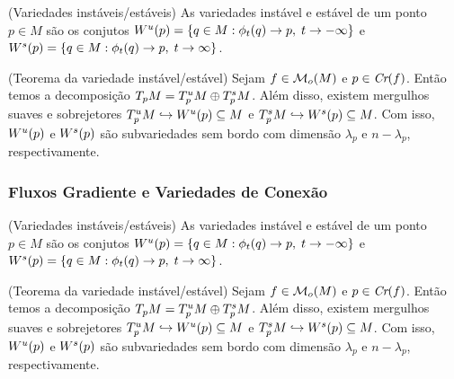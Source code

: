 \documentclass{beamer}
\begin{document}
	\begin{frame}
		\begin{definicao}
			(Variedades instáveis/estáveis)  As variedades instável e estável de um ponto $p \in M$ são os conjutos $W^{u}(p) = \{q\in M: \phi_{t}(q) \to p,\; t\to -\infty\}$ e $W^{s}(p) = \{q\in M: \phi_{t}(q) \to p,\; t\to \infty\}$.
		\end{definicao}
		\begin{teorema}
			(Teorema da variedade instável/estável) Sejam $f \in \mathcal{M}_{o}(M)$ e $p \in \textit{Cr}(f)$. Então temos a decomposição $T_{p}M=T^{u}_{p}M\oplus T^{s}_{p}M$. Além disso, existem mergulhos suaves e sobrejetores $T^{u}_{p}M \hookrightarrow W^{u}(p) \subseteq M$ e $T^{s}_{p}M \hookrightarrow W^{s}(p) \subseteq M$. Com isso, $W^{u}(p)$ e $W^{s}(p)$ são subvariedades sem bordo com dimensão $\lambda_{p}$ e $n-\lambda_{p}$, respectivamente.
		\end{teorema}
		
	\end{frame}
	\begin{frame}
		\frametitle{Fluxos Gradiente e Variedades de Conexão}
		\begin{definicao}
			(Variedades instáveis/estáveis)  As variedades instável e estável de um ponto $p \in M$ são os conjutos $W^{u}(p) = \{q\in M: \phi_{t}(q) \to p,\; t\to -\infty\}$ e $W^{s}(p) = \{q\in M: \phi_{t}(q) \to p,\; t\to \infty\}$.
		\end{definicao}
		\begin{teorema}
			(Teorema da variedade instável/estável) Sejam $f \in \mathcal{M}_{o}(M)$ e $p \in \textit{Cr}(f)$. Então temos a decomposição $T_{p}M=T^{u}_{p}M\oplus T^{s}_{p}M$. Além disso, existem mergulhos suaves e sobrejetores $T^{u}_{p}M \hookrightarrow W^{u}(p) \subseteq M$ e $T^{s}_{p}M \hookrightarrow W^{s}(p) \subseteq M$. Com isso, $W^{u}(p)$ e $W^{s}(p)$ são subvariedades sem bordo com dimensão $\lambda_{p}$ e $n-\lambda_{p}$, respectivamente.
		\end{teorema}
		
	\end{frame}
	
\end{document}

